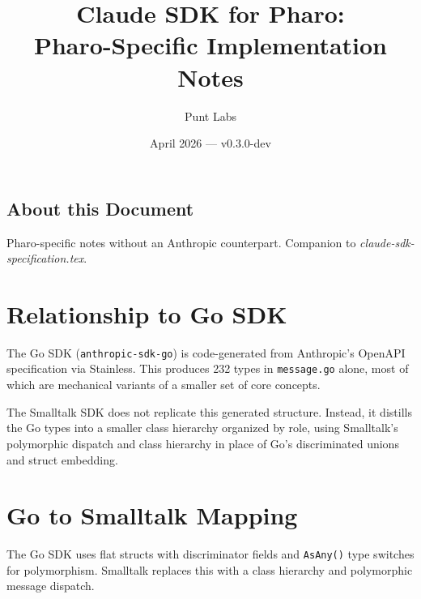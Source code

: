 \documentclass[a4paper,10pt,fleqn]{article}
\begin{document}
\title{Claude SDK for Pharo:\\Pharo-Specific Implementation Notes}
\author{Punt Labs}
\date{April 2026 --- v0.3.0-dev}
\maketitle

\tableofcontents
\newpage

\subsection*{About this Document}

Pharo-specific notes without an Anthropic counterpart.  Companion
to \emph{claude-sdk-specification.tex}.

\section{Relationship to Go SDK}

The Go SDK (\texttt{anthropic-sdk-go}) is code-generated from Anthropic's
OpenAPI specification via Stainless.  This produces 232 types in
\texttt{message.go} alone, most of which are mechanical variants of a
smaller set of core concepts.

The Smalltalk SDK does not replicate this generated structure.  Instead, it
distills the Go types into a smaller class hierarchy organized by role,
using Smalltalk's polymorphic dispatch and class hierarchy in place of Go's
discriminated unions and struct embedding.

\section{Go to Smalltalk Mapping}

The Go SDK uses flat structs with discriminator fields and \texttt{AsAny()}
type switches for polymorphism.  Smalltalk replaces this with a class
hierarchy and polymorphic message dispatch.
\end{document}
